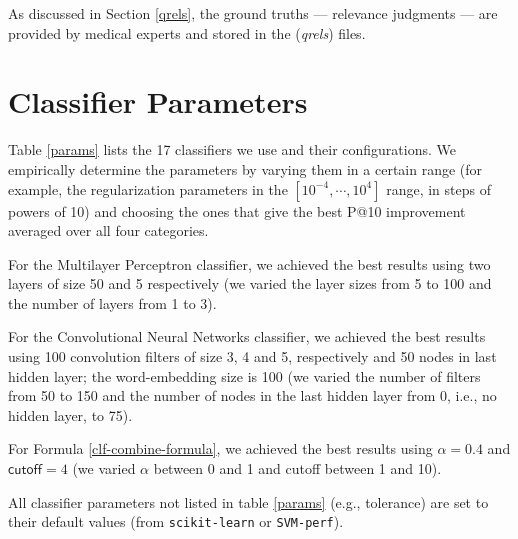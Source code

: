 As discussed in Section \ref{qrels}, the ground truths --- relevance judgments --- are provided by medical experts
and stored in the (\emph{qrels}) files.

\section{Classifier Parameters}
Table \ref{params} lists the 17 classifiers we use and their configurations.
We empirically determine
the
parameters by varying them in a certain range (for example, the regularization parameters
in the $[10^{-4},\cdots,10^4]$ range, in steps of powers of 10) and choosing the ones
that give the
best P@10 improvement averaged over all four categories.

For the Multilayer Perceptron classifier, we achieved the best results using two layers of size 50 and 5 respectively
(we varied the layer sizes from 5 to 100 and the number of layers from 1 to 3).

For the Convolutional Neural Networks classifier, we achieved the best results
using 100 convolution filters of size 3, 4 and 5, respectively and 50 nodes in last hidden layer; the word-embedding size is 100
(we varied the number of filters from 50 to 150 and the number of nodes in the last hidden layer from 0, i.e., no hidden layer, to 75).

For Formula \ref{clf-combine-formula}, we achieved the best results using
$\alpha=0.4$ and $\textsf{cutoff}=4$ (we varied $\alpha$  between 0 and 1 and \textsf{cutoff} between 1 and 10).

All classifier parameters not listed in table \ref{params} (e.g., tolerance) are set to their default values (from \texttt{scikit-learn} or \texttt{SVM-perf}).

